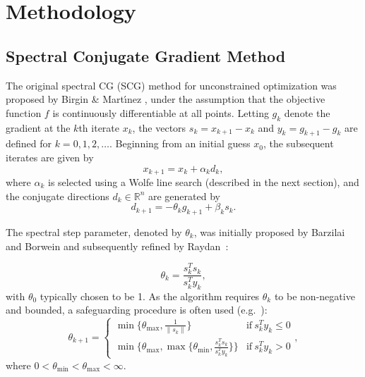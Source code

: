\documentclass[]{interact}
\newcommand{\Real}{\mathbb{R}}
\theoremstyle{plain}%
\theoremstyle{definition}
\theoremstyle{remark}
\begin{document}
\section{Methodology}
\label{S:methodology}

\subsection{Spectral Conjugate Gradient Method}\label{sec:2.1}

{The original spectral CG (SCG) method for unconstrained optimization was proposed by Birgin \& Mart\'{\i}nez \cite{Bm01}, under the assumption that the objective function $f$ is continuously differentiable at all points.} Letting $g_k$ denote the gradient at the $k$th iterate $x_k$, the vectors $s_k=x_{k+1} -x_{k}$ and $y_{k}=g_{k+1}-g_k$ are defined for $k=0,1,2,\dots$. Beginning from an initial guess $x_0$, the subsequent iterates are given by
\[x_{k+1}= x_k + \alpha_kd_k,\]
where $\alpha_k$ is selected using a Wolfe line search (described in the next section), and the conjugate directions $d_k\in \Real^n$ are generated by
\begin{equation}
d_{k+1} = -\theta_kg_{k+1} +\beta_ks_k. \label{E:searchdir}
\end{equation}

{The spectral step parameter, denoted by $\theta_{k}$, was initially proposed by Barzilai and Borwein \cite{BarBor:88} and subsequently refined by Raydan~\cite{Raydan:93,Raydan:97}:}

 \begin{equation}
   \label{formula}
  \theta_{k} = \frac{s_{k}^T s_{k}}{s_{k}^T y_{k}},
   \end{equation}
with $\theta_0$ typically chosen to be 1. As the algorithm requires $\theta_k$ to be non-negative and bounded, a safeguarding procedure is often used (e.g.~\cite{Loreto:19}):
\begin{equation}
   \label{proc2.1}
     \theta_{k+1} = \left\{
	       \begin{array}{ll}
		\min\{\theta_{\max},\displaystyle\frac{1}{\parallel s_{k}\parallel}\}     & \mathrm{if \ } s_{k}^Ty_{k} \le 0 \\
		\min\{\theta_{\max},\max\{\theta_{\min},\displaystyle\frac{s_{k}^Ts_{k}}{s_{k}^Ty_{k}}\}\}     & \mathrm{if\ } s_{k}^Ty_{k}>0
		 \end{array},
	     \right.
   \end{equation}
   where $\displaystyle 0<\theta_{\min}<\theta_{\max}<\infty$.
\end{document}
